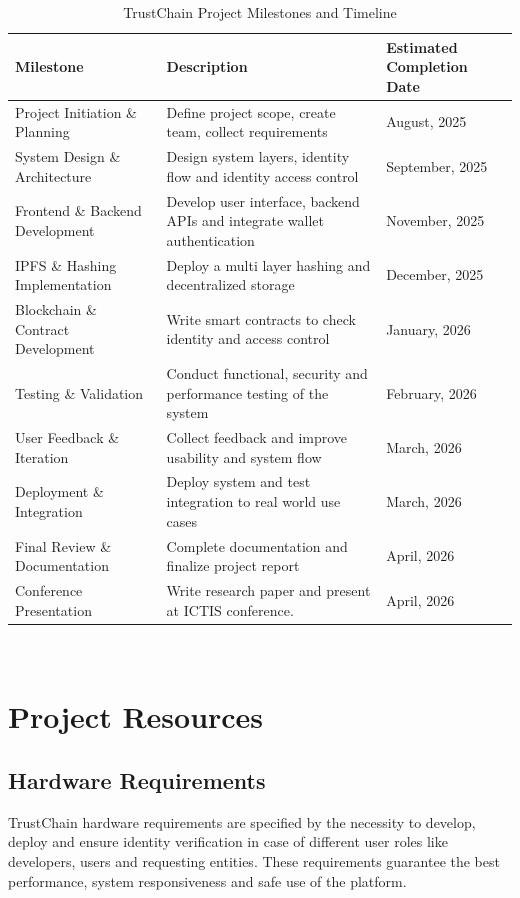 \begin{table}[h!]
\centering
\begin{tabular}{|p{4cm}|p{7cm}|p{4cm}|}
\hline
\textbf{Milestone} & \textbf{Description} & \textbf{Estimated Completion Date} \\
\hline
Project Initiation \& Planning & Define project scope, create team, collect requirements & August, 2025 \\
\hline
System Design \& Architecture & Design system layers, identity flow and identity access control & September, 2025 \\
\hline
Frontend \& Backend Development & Develop user interface, backend APIs and integrate wallet authentication & November, 2025 \\
\hline
IPFS \& Hashing Implementation & Deploy a multi layer hashing and decentralized storage & December, 2025 \\
\hline
Blockchain \& Contract Development & Write smart contracts to check identity and access control & January, 2026 \\
\hline
Testing \& Validation & Conduct functional, security and performance testing of the system & February, 2026 \\
\hline
User Feedback \& Iteration & Collect feedback and improve usability and system flow & March, 2026 \\
\hline
Deployment \& Integration & Deploy system and test integration to real world use cases & March, 2026 \\
\hline
Final Review \& Documentation & Complete documentation and finalize project report & April, 2026 \\
\hline
Conference Presentation & Write research paper and present at ICTIS conference. & April, 2026 \\
\hline
\end{tabular}
\caption{TrustChain Project Milestones and Timeline}
\end{table}

\\ 


\section{Project Resources}

\subsection{Hardware Requirements}
TrustChain hardware requirements are specified by the necessity to develop, deploy and ensure identity verification in case of different user roles like developers, users and requesting entities. These requirements guarantee the best performance, system responsiveness and safe use of the platform.

